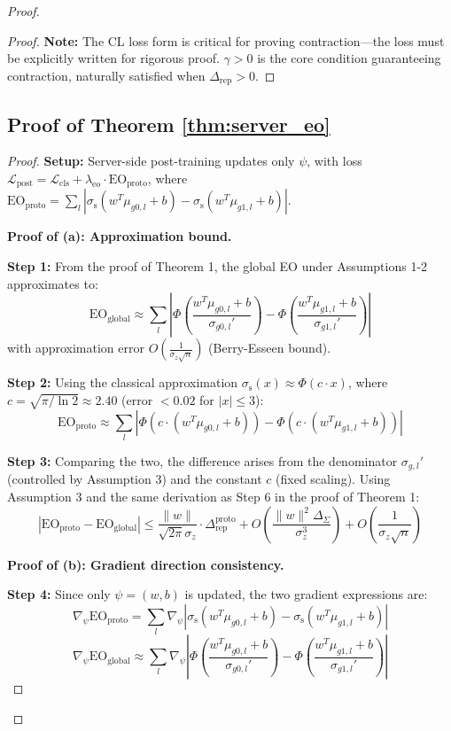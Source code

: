 \documentclass[11pt]{article}
\begin{document}
\begin{proof}
\begin{proof}
\textbf{Note:} The CL loss form is critical for proving contraction---the loss must be explicitly written for rigorous proof. $\gamma > 0$ is the core condition guaranteeing contraction, naturally satisfied when $\Delta_{\mathrm{rep}} > 0$.
\end{proof}

\subsection{Proof of Theorem \ref{thm:server_eo}}

\begin{proof}
\textbf{Setup:} Server-side post-training updates only $\psi$, with loss $\mathcal{L}_{\mathrm{post}} = \mathcal{L}_{\mathrm{cls}} + \lambda_{\mathrm{eo}} \cdot \mathrm{EO}_{\mathrm{proto}}$, where $\mathrm{EO}_{\mathrm{proto}} = \sum_l |\sigma_{\text{s}}(w^T \mu_{g0,l} + b) - \sigma_{\text{s}}(w^T \mu_{g1,l} + b)|$.

\textbf{Proof of (a): Approximation bound.}

\textbf{Step 1:} From the proof of Theorem 1, the global EO under Assumptions 1-2 approximates to:
$$\mathrm{EO}_{\mathrm{global}} \approx \sum_l \left|\Phi\left(\frac{w^T \mu_{g0,l} + b}{\sigma_{g0,l}'}\right) - \Phi\left(\frac{w^T \mu_{g1,l} + b}{\sigma_{g1,l}'}\right)\right|$$
with approximation error $O\left(\frac{1}{\sigma_z\sqrt{n}}\right)$ (Berry-Esseen bound).

\textbf{Step 2:} Using the classical approximation $\sigma_{\text{s}}(x) \approx \Phi(c \cdot x)$, where $c = \sqrt{\pi / \ln 2} \approx 2.40$ (error $< 0.02$ for $|x| \leq 3$):
$$\mathrm{EO}_{\mathrm{proto}} \approx \sum_l \left|\Phi\left(c \cdot (w^T \mu_{g0,l} + b)\right) - \Phi\left(c \cdot (w^T \mu_{g1,l} + b)\right)\right|$$

\textbf{Step 3:} Comparing the two, the difference arises from the denominator $\sigma_{g,l}'$ (controlled by Assumption 3) and the constant $c$ (fixed scaling). Using Assumption 3 and the same derivation as Step 6 in the proof of Theorem 1:
$$|\mathrm{EO}_{\mathrm{proto}} - \mathrm{EO}_{\mathrm{global}}| \leq \frac{\|w\|}{\sqrt{2\pi}\sigma_z} \cdot \Delta_{\mathrm{rep}}^{\mathrm{proto}} + O\left(\frac{\|w\|^2 \Delta_{\Sigma}}{\sigma_z^3}\right) + O\left(\frac{1}{\sigma_z\sqrt{n}}\right)$$

\textbf{Proof of (b): Gradient direction consistency.}

\textbf{Step 4:} Since only $\psi = (w, b)$ is updated, the two gradient expressions are:
$$\nabla_\psi \mathrm{EO}_{\mathrm{proto}} = \sum_l \nabla_\psi |\sigma_{\text{s}}(w^T \mu_{g0,l} + b) - \sigma_{\text{s}}(w^T \mu_{g1,l} + b)|$$
$$\nabla_\psi \mathrm{EO}_{\mathrm{global}} \approx \sum_l \nabla_\psi \left|\Phi\left(\frac{w^T \mu_{g0,l} + b}{\sigma_{g0,l}'}\right) - \Phi\left(\frac{w^T \mu_{g1,l} + b}{\sigma_{g1,l}'}\right)\right|$$


\end{proof}
\end{proof}
\end{document}
